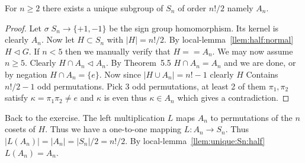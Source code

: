 \documentclass[12pt]{book}
\def\subnormal{\vartriangleleft}
\newcounter{myenumi}
\newenvironment{myenumerate}
{\begin{enumerate}
 \setcounter{enumi}{\themyenumi}
}
{\setcounter{myenumi}{\theenumi}
 \end{enumerate}}
\begin{document}
\begin{myenumerate}
\begin{enumerate}[(a)]
\begin{llem} \label{llem:unique:Sn:half}
For \(n\geq 2\) there exists a unique subgroup of \(S_n\) of order \(n!/2\)
namely \(A_n\).
\end{llem}
\begin{proof}
Let \(\sigma\;S_n\to \{+1,-1\}\) be the sign group homomorphism.
Its kernel is clearly \(A_n\).
Now let \(H\subset S_n\) with \(|H|=n!/2\).
By local-lemma~\ref{llem:half:normal} \(H\subnormal G\).
If \(n<5\) then we manually verify that  \(H==A_n\). 
We may now assume \(n\geq 5\).
Clearly \(H\cap A_n \subnormal A_n\). By Theorem~5.5
\(H\cap A_n = A_n\) and we are done, 
or by negation \(H\cap A_n = \{e\}\). Now since \(|H\cup A_n| = n! -1\)
clearly $H$ Contains \(n!/2 - 1\) odd permutations.
Pick 3 odd permutations, at least 2 of them \(\pi_1, \pi_2\)
satisfy \(\kappa=\pi_1\pi_2 \neq e\) and \(\kappa\) is even
thus \(\kappa \in A_n\) which gives a contradiction.
\iffalse
As was shown in the text, \(A_n\) is generated by all 3-cycles
using \([ij][rs] = [ijr][irs]\).
If by negation \(H \neq A_n\) then both $H$ and \(S_n\setminus H\)
contains some 3-cycles. Say
\begin{equation*}
[ijk] \in H \qquad [xyz]\in S_n\setminus H
\end{equation*}
Say \(I = \{i,j,k\}\cap \{x,y,z\}\).
Without loss of generality we may assume
that if \(|I|\geq 1\) then \(i=x\)
and  if \(|I|=2\) then \(j=y\)
Now consider
\begin{equation*}
\sigma =
 \left\{
  \begin{array}{ll}
   {[ix]}[jy][kz] \quad &\textnormal{if}\; |I|=0 \\
   {[jy]}[kz] \quad &\textnormal{if}\; |I|=1 \\
   {[kz]} \quad &\textnormal{if}\; |I|=2 \\
  \end{array}
 \right.
\end{equation*}
Now \([xyz] = \sigma [ijk] \sigma^{-1}\).
And by \(H \subnormal S_n\) we have the contrdiction \([xyz] \in H\).
\fi
\end{proof}

Back to the exercise.
The left multiplication $L$ maps \(A_n\) to permutations
of the $n$ cosets of $H$.
Thus we have a one-to-one mapping \(L: A_n \rightarrow S_n\).
Thus \(|L(A_n)|=|A_n|=|S_n|/2 = n!/2\).
By local-lemma~\ref{llem:unique:Sn:half} \(L(A_n)=A_n\).


\end{enumerate}
\end{myenumerate}
\end{document}
